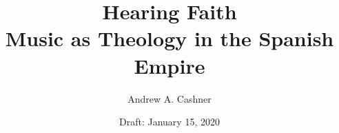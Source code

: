 \documentclass{tex/vcbook}
\title{Hearing Faith\\
Music as Theology in the Spanish Empire}
\author{Andrew A. Cashner}
\date{Draft: January 15, 2020}
\begin{document}
\maketitle

\frontmatter


\tableofcontents* \clearpage
\listoffigures
\listofdiagrams
\listoftables
\listofpoemexamples
\listofmusicexamples

\mainmatter







\backmatter


\printindex
\end{document}
